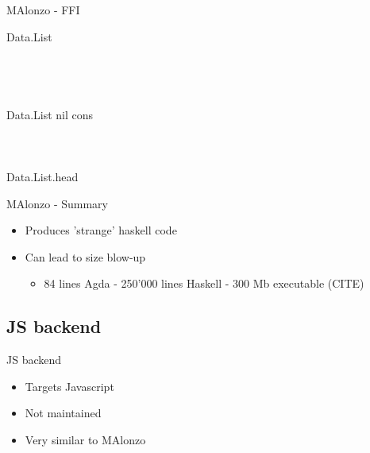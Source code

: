 \begin{frame}[fragile]{MAlonzo - FFI}
\begin{code}%
\>\AgdaSymbol{\{-\#}  Data.List \AgdaSymbol{\#-\}}\<%
\\
%
\\
\>  \AgdaSymbol{:} \AgdaSymbol{(} \AgdaSymbol{:} \AgdaSymbol{)} \AgdaSymbol{->}  \<%
\\
\>[0]\<[2]%
\>[2] \AgdaSymbol{:}  \AgdaSymbol{\{}\AgdaSymbol{\}}   \<%
\\
\>[0]\<[2]%
\>[2] \AgdaSymbol{:}  \AgdaSymbol{\{}\AgdaSymbol{\}}        \<%
\\
\>\AgdaSymbol{\{-\#}   Data.List nil cons \AgdaSymbol{\#-\}}\<%
\\
%
\\
\>\<%
\\
\>[0]\<[2]%
\>[2] \AgdaSymbol{:}  \AgdaSymbol{\{}\AgdaSymbol{\}}    \AgdaSymbol{->} \<%
\\
\>\AgdaSymbol{\{-\#}   Data.List.head \AgdaSymbol{\#-\}}\<%
\\
\>\<%
\end{code}
\end{frame}


\begin{frame}{MAlonzo - Summary}
\begin{itemize}
  \item Produces 'strange' haskell code
  \item Can lead to size blow-up
  \begin {itemize}
    \item 84 lines Agda - 250'000 lines Haskell - 300 Mb executable (CITE)
  \end{itemize}
\end{itemize}
\end{frame}

\subsection{JS backend}
\begin{frame}{JS backend}
\begin{itemize}
\item Targets Javascript
\item Not maintained
\item Very similar to MAlonzo
\end{itemize}
\end{frame}

